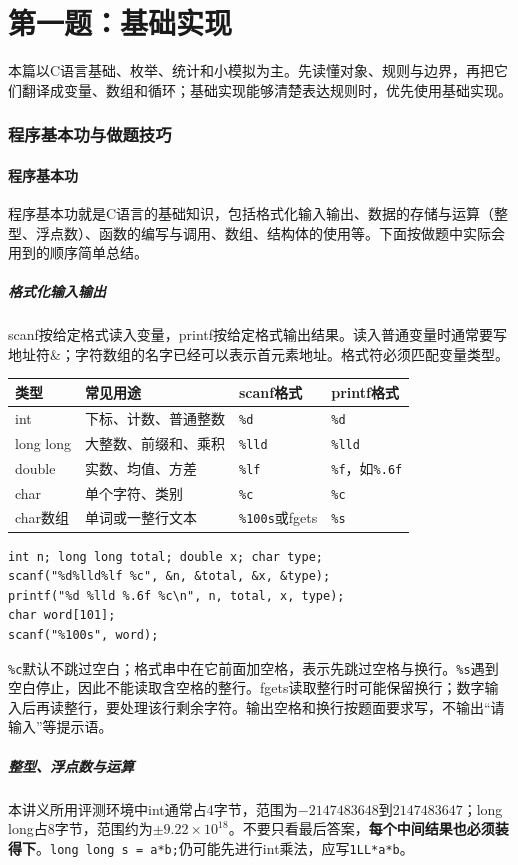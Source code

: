 \clearpage
\part{第一题：基础实现}
本篇以C语言基础、枚举、统计和小模拟为主。先读懂对象、规则与边界，再把它们翻译成变量、数组和循环；基础实现能够清楚表达规则时，优先使用基础实现。
\section{程序基本功与做题技巧}
\subsection{程序基本功}
程序基本功就是C语言的基础知识，包括格式化输入输出、数据的存储与运算（整型、浮点数）、函数的编写与调用、数组、结构体的使用等。下面按做题中实际会用到的顺序简单总结。
\subsubsection{格式化输入输出}
scanf按给定格式读入变量，printf按给定格式输出结果。读入普通变量时通常要写地址符\&；字符数组的名字已经可以表示首元素地址。格式符必须匹配变量类型。
\begin{longtable}{P{2.3cm}P{3.7cm}P{4.5cm}P{3.7cm}}
\toprule 类型 & 常见用途 & scanf格式 & printf格式\\\midrule\endhead
int & 下标、计数、普通整数 & \texttt{\%d} & \texttt{\%d}\\
long long & 大整数、前缀和、乘积 & \texttt{\%lld} & \texttt{\%lld}\\
double & 实数、均值、方差 & \texttt{\%lf} & \texttt{\%f}，如\texttt{\%.6f}\\
char & 单个字符、类别 & \texttt{\%c} & \texttt{\%c}\\
char数组 & 单词或一整行文本 & \texttt{\%100s}或fgets & \texttt{\%s}\\
\bottomrule\end{longtable}
\begin{lstlisting}
int n; long long total; double x; char type;
scanf("%d%lld%lf %c", &n, &total, &x, &type);
printf("%d %lld %.6f %c\n", n, total, x, type);
char word[101];
scanf("%100s", word);
\end{lstlisting}
\texttt{\%c}默认不跳过空白；格式串中在它前面加空格，表示先跳过空格与换行。\texttt{\%s}遇到空白停止，因此不能读取含空格的整行。fgets读取整行时可能保留换行；数字输入后再读整行，要处理该行剩余字符。输出空格和换行按题面要求写，不输出“请输入”等提示语。
\subsubsection{整型、浮点数与运算}
本讲义所用评测环境中int通常占4字节，范围为$-2147483648$到$2147483647$；long long占8字节，范围约为$\pm9.22\times10^{18}$。不要只看最后答案，\textbf{每个中间结果也必须装得下}。\texttt{long long s = a*b;}仍可能先进行int乘法，应写\texttt{1LL*a*b}。

